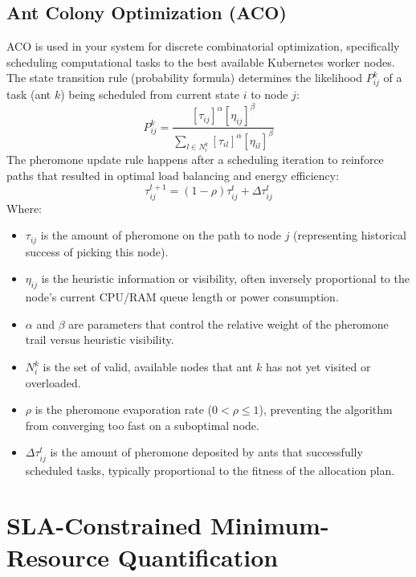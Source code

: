 \documentclass[12pt,a4paper]{report}
\begin{document}
\subsection{Ant Colony Optimization (ACO)}
ACO is used in your system for discrete combinatorial optimization, specifically scheduling computational tasks to the best available Kubernetes worker nodes.
The state transition rule (probability formula) determines the likelihood $P_{ij}^{k}$ of a task (ant $k$) being scheduled from current state $i$ to node $j$:
\begin{equation}
P_{ij}^{k}=\frac{[\tau_{ij}]^{\alpha}[\eta_{ij}]^{\beta}}{\sum_{l \in N_{i}^{k}} [\tau_{il}]^{\alpha}[\eta_{il}]^{\beta}}
\end{equation}
The pheromone update rule happens after a scheduling iteration to reinforce paths that resulted in optimal load balancing and energy efficiency:
\begin{equation}
\tau_{ij}^{t+1}=(1-\rho)\tau_{ij}^{t}+\Delta\tau_{ij}^{t}
\end{equation}
Where:
\begin{itemize}
    \item $\tau_{ij}$ is the amount of pheromone on the path to node $j$ (representing historical success of picking this node).
    \item $\eta_{ij}$ is the heuristic information or visibility, often inversely proportional to the node's current CPU/RAM queue length or power consumption.
    \item $\alpha$ and $\beta$ are parameters that control the relative weight of the pheromone trail versus heuristic visibility.
    \item $N_{i}^{k}$ is the set of valid, available nodes that ant $k$ has not yet visited or overloaded.
    \item $\rho$ is the pheromone evaporation rate ($0 < \rho \le 1$), preventing the algorithm from converging too fast on a suboptimal node.
    \item $\Delta\tau_{ij}^{t}$ is the amount of pheromone deposited by ants that successfully scheduled tasks, typically proportional to the fitness of the allocation plan.
\end{itemize}
\lipsum[57-61]

\section{SLA-Constrained Minimum-Resource Quantification}
\end{document}
